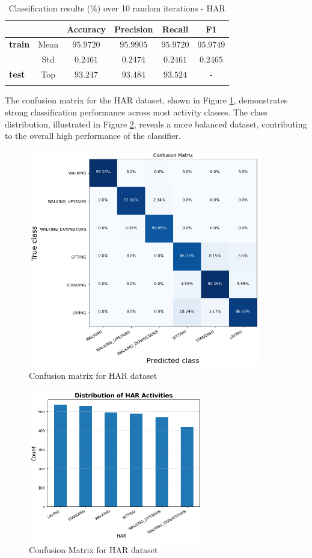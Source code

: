 \begin{table}[h!]
\centering
\caption{Classification results ($\%$) over 10 random iterations - HAR}
\begin{tabular}{lccccc}
\hline
 &  & Accuracy & Precision & Recall & F1 \\
\hline
\textbf{train} & Mean  & $95.9720$ & $95.9905$ & $95.9720$ & $95.9749$  \\
& Std   & $0.2461$ & $0.2474$ & $0.2461$ & $0.2465$  \\
\hline
\textbf{test}  & Top  & $93.247$   & $93.484$   & $93.524$   & -           \\
\hline
\label{har_results}
\end{tabular}
\end{table}

The confusion matrix for the HAR dataset, shown in Figure \ref{conf_matrix_har}, demonstrates strong classification performance across most activity classes. The class distribution, illustrated in Figure \ref{dist_har}, reveals a more balanced dataset, contributing to the overall high performance of the classifier.

\begin{figure}[H]
  \centering
  \includegraphics[width = 4in, keepaspectratio]{figures/CM_HAR.png}
  \caption{Confusion matrix for HAR dataset}
  \label{conf_matrix_har}
\end{figure}

\begin{figure}[H]
  \centering
  \includegraphics[width = 3in, keepaspectratio]{figures/Count Plot - HAR.png}
  \caption{Confusion Matrix for HAR dataset}
  \label{dist_har}
\end{figure}

